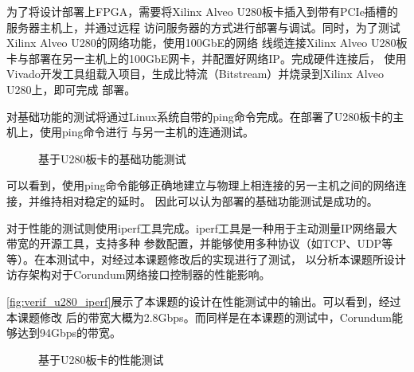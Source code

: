 为了将设计部署上FPGA，需要将Xilinx Alveo U280板卡插入到带有PCIe插槽的服务器主机上，并通过远程
访问服务器的方式进行部署与调试。同时，为了测试Xilinx Alveo U280的网络功能，使用100GbE的网络
线缆连接Xilinx Alveo U280板卡与部署在另一主机上的100GbE网卡，并配置好网络IP。完成硬件连接后，
使用Vivado开发工具组载入项目，生成比特流（Bitstream）并烧录到Xilinx Alveo U280上，即可完成
部署。


对基础功能的测试将通过Linux系统自带的ping命令完成。在部署了U280板卡的主机上，使用ping命令进行
与另一主机的连通测试。

\begin{figure}[htb]
\center
{}
\caption{基于U280板卡的基础功能测试}
\label{fig:verif_u280_connect}
\end{figure}

可以看到，使用ping命令能够正确地建立与物理上相连接的另一主机之间的网络连接，并维持相对稳定的延时。
因此可以认为部署的基础功能测试是成功的。


对于性能的测试则使用iperf工具完成。iperf工具是一种用于主动测量IP网络最大带宽的开源工具，支持多种
参数配置，并能够使用多种协议（如TCP、UDP等等）。在本测试中，对经过本课题修改后的实现进行了测试，
以分析本课题所设计访存架构对于Corundum网络接口控制器的性能影响。

\autoref{fig:verif_u280_iperf}展示了本课题的设计在性能测试中的输出。可以看到，经过本课题修改
后的带宽大概为2.8Gbps。而同样是在本课题的测试中，Corundum能够达到94Gbps的带宽。

\begin{figure}[htb]
\center
{}
\caption{基于U280板卡的性能测试}
\label{fig:verif_u280_iperf}
\end{figure}

